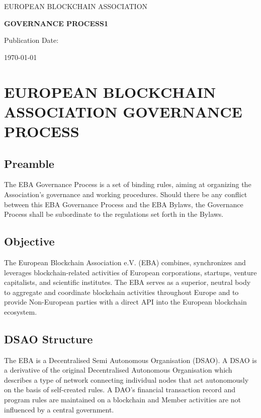 \documentclass{article}
\begin{document}
\begin{titlepage}

	\vfill
	
	\centering
	{\scshape\LARGE EUROPEAN BLOCKCHAIN ASSOCIATION \par}
	\vspace{1cm}
	{\huge\bfseries GOVERNANCE PROCESS1 \par}
	\vspace{2cm}
	
	\vfill
	Publication Date:\par
	\today

	\vfill
	
\end{titlepage}

\tableofcontents
\newpage

\section{EUROPEAN BLOCKCHAIN ASSOCIATION GOVERNANCE PROCESS}

\subsection{Preamble}

The EBA Governance Process is a set of binding rules, aiming at organizing the Association's governance and working procedures. 
Should there be any conflict between this EBA Governance Process and the EBA Bylaws, the Governance Process shall be subordinate to the regulations set forth in the Bylaws.

\subsection{Objective}

The European Blockchain Association e.V. (EBA) combines, synchronizes and leverages blockchain-related activities of European corporations, startups, venture capitalists, and scientific institutes. 
The EBA serves as a superior, neutral body to aggregate and coordinate blockchain activities throughout Europe and to provide Non-European parties with a direct API into the European blockchain ecosystem.

\subsection{DSAO Structure}

The EBA is a Decentralised Semi Autonomous Organisation (DSAO). 
A DSAO is a derivative of the original Decentralised Autonomous Organisation which describes a type of network connecting individual nodes that act autonomously on the basis of self-created rules. 
A DAO's financial transaction record and program rules are maintained on a blockchain and Member activities are not influenced by a central government.
\end{document}
